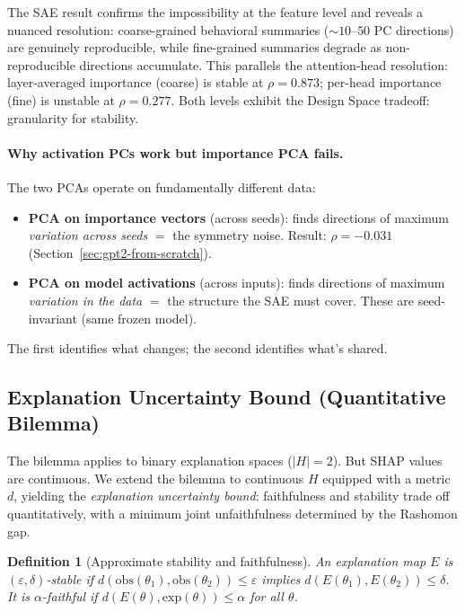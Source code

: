 \documentclass{article}
\newtheorem{definition}[theorem]{Definition}
\begin{document}
The SAE result confirms the impossibility at the feature level and reveals a nuanced resolution: coarse-grained behavioral summaries (${\sim}10$--$50$ PC directions) are genuinely reproducible, while fine-grained summaries degrade as non-reproducible directions accumulate. This parallels the attention-head resolution: layer-averaged importance (coarse) is stable at $\rho = 0.873$; per-head importance (fine) is unstable at $\rho = 0.277$. Both levels exhibit the Design Space tradeoff: granularity for stability.

\paragraph{Why activation PCs work but importance PCA fails.}
The two PCAs operate on fundamentally different data:
\begin{itemize}
  \item \textbf{PCA on importance vectors} (across seeds): finds directions of maximum \emph{variation across seeds} $=$ the symmetry noise. Result: $\rho = -0.031$ (Section~\ref{sec:gpt2-from-scratch}).
  \item \textbf{PCA on model activations} (across inputs): finds directions of maximum \emph{variation in the data} $=$ the structure the SAE must cover. These are seed-invariant (same frozen model).
\end{itemize}
The first identifies what changes; the second identifies what's shared.

\subsection{Explanation Uncertainty Bound (Quantitative Bilemma)}
\label{sec:quantitative-bilemma}

The bilemma applies to binary explanation spaces ($|H| = 2$). But SHAP values are continuous. We extend the bilemma to continuous $H$ equipped with a metric $d$, yielding the \emph{explanation uncertainty bound}: faithfulness and stability trade off quantitatively, with a minimum joint unfaithfulness determined by the Rashomon gap.

\begin{definition}[Approximate stability and faithfulness]
An explanation map $E$ is \emph{$(\varepsilon, \delta)$-stable} if $d(\text{obs}(\theta_1), \text{obs}(\theta_2)) \leq \varepsilon$ implies $d(E(\theta_1), E(\theta_2)) \leq \delta$. It is \emph{$\alpha$-faithful} if $d(E(\theta), \text{exp}(\theta)) \leq \alpha$ for all $\theta$.
\end{definition}
\end{document}
